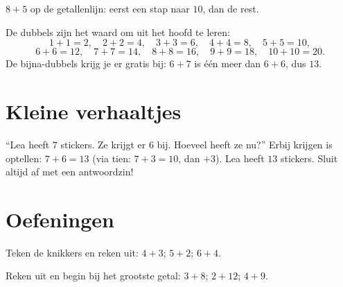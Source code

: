 \begin{omfigure}

{\small $8 + 5$ op de getallenlijn: eerst een stap naar $10$, dan de
rest.}
\end{omfigure}

\begin{example}[Dubbels]\label{ex:g1:addition:doubles}
De dubbels zijn het waard om uit het hoofd te leren:
\[
1+1=2, \quad 2+2=4, \quad 3+3=6, \quad 4+4=8, \quad 5+5=10,
\]
\[
6+6=12, \quad 7+7=14, \quad 8+8=16, \quad 9+9=18, \quad 10+10=20 .
\]
De bijna-dubbels krijg je er gratis bij: $6 + 7$ is één meer dan
$6 + 6$, dus $13$.
\end{example}

\section{Kleine verhaaltjes}

\begin{example}\label{ex:g1:addition:problem}
``Lea heeft $7$ stickers. Ze krijgt er $6$ bij. Hoeveel heeft ze nu?''
Erbij krijgen is optellen: $7 + 6 = 13$ (via tien: $7 + 3 = 10$, dan
$+3$). Lea heeft $13$ stickers. Sluit altijd af met een antwoordzin!
\end{example}

\section{Oefeningen}

\begin{exercise}[$\star$]\label{exo:g1:addition:1}
Teken de knikkers en reken uit: $4 + 3$; \quad $5 + 2$; \quad
$6 + 4$.
\end{exercise}

\begin{exercise}[$\star$]\label{exo:g1:addition:2}
Reken uit en begin bij het grootste getal: $3 + 8$; \quad
$2 + 12$; \quad $4 + 9$.
\end{exercise}

